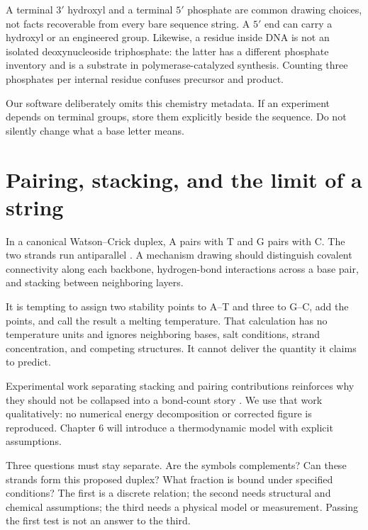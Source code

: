 A terminal $3'$ hydroxyl and a terminal $5'$ phosphate are common drawing
choices, not facts recoverable from every bare sequence string. A $5'$ end
can carry a hydroxyl or an engineered group. Likewise, a residue inside DNA
is not an isolated deoxynucleoside triphosphate: the latter has a different
phosphate inventory and is a substrate in polymerase-catalyzed synthesis.
Counting three phosphates per internal residue confuses precursor and product.

Our software deliberately omits this chemistry metadata. If an experiment
depends on terminal groups, store them explicitly beside the sequence.
Do not silently change what a base letter means.

\section{Pairing, stacking, and the limit of a string}

In a canonical Watson--Crick duplex, A pairs with T and G pairs with C.
The two strands run antiparallel \cite{nhgri}. A mechanism drawing should
distinguish covalent connectivity along each backbone, hydrogen-bond
interactions across a base pair, and stacking between neighboring layers.


It is tempting to assign two stability points to A--T and three to G--C,
add the points, and call the result a melting temperature. That calculation
has no temperature units and ignores neighboring bases, salt conditions,
strand concentration, and competing structures. It cannot deliver the
quantity it claims to predict.

Experimental work separating stacking and pairing contributions reinforces
why they should not be collapsed into a bond-count story
\cite{stacking,stacking-correction}. We use that work qualitatively:
no numerical energy decomposition or corrected figure is reproduced.
Chapter 6 will introduce a thermodynamic model with explicit assumptions.

Three questions must stay separate. Are the symbols complements? Can these
strands form this proposed duplex? What fraction is bound under specified
conditions? The first is a discrete relation; the second needs structural
and chemical assumptions; the third needs a physical model or measurement.
Passing the first test is not an answer to the third.

